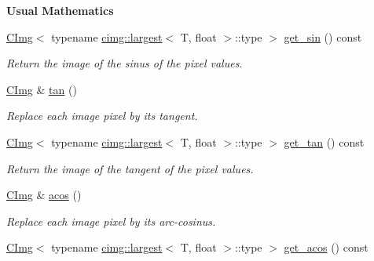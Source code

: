\begin{Indent}{\bf Usual Mathematics}
\begin{DoxyCompactItemize}
\hyperlink{structcimg__library_1_1_c_img}{CImg}$<$ typename \hyperlink{structcimg__library_1_1cimg_1_1largest}{cimg::largest}$<$ T, float $>$::type $>$ \hyperlink{structcimg__library_1_1_c_img_a86e07082afba687d908288b97e8b4c22}{get\_\-sin} () const 
\begin{DoxyCompactList}\small\item\em Return the image of the sinus of the pixel values. \item\end{DoxyCompactList}\item 
\hyperlink{structcimg__library_1_1_c_img}{CImg} \& \hyperlink{structcimg__library_1_1_c_img_aa898115ad56312c0dd33409bf559d69b}{tan} ()
\begin{DoxyCompactList}\small\item\em Replace each image pixel by its tangent. \item\end{DoxyCompactList}\item 
\hyperlink{structcimg__library_1_1_c_img}{CImg}$<$ typename \hyperlink{structcimg__library_1_1cimg_1_1largest}{cimg::largest}$<$ T, float $>$::type $>$ \hyperlink{structcimg__library_1_1_c_img_a06cb744b9c5bc08a0a46633856a59933}{get\_\-tan} () const 
\begin{DoxyCompactList}\small\item\em Return the image of the tangent of the pixel values. \item\end{DoxyCompactList}\item 
\hypertarget{structcimg__library_1_1_c_img_a97c809dd1e8e6491246f33c033a694d9}{
\hyperlink{structcimg__library_1_1_c_img}{CImg} \& \hyperlink{structcimg__library_1_1_c_img_a97c809dd1e8e6491246f33c033a694d9}{acos} ()}
\label{structcimg__library_1_1_c_img_a97c809dd1e8e6491246f33c033a694d9}

\begin{DoxyCompactList}\small\item\em Replace each image pixel by its arc-\/cosinus. \item\end{DoxyCompactList}\item 
\hypertarget{structcimg__library_1_1_c_img_a8c16fb6d49142b2faab18c89da0dd14b}{
\hyperlink{structcimg__library_1_1_c_img}{CImg}$<$ typename \hyperlink{structcimg__library_1_1cimg_1_1largest}{cimg::largest}$<$ T, float $>$::type $>$ \hyperlink{structcimg__library_1_1_c_img_a8c16fb6d49142b2faab18c89da0dd14b}{get\_\-acos} () const }
\label{structcimg__library_1_1_c_img_a8c16fb6d49142b2faab18c89da0dd14b}


\end{DoxyCompactItemize}
\end{Indent}
